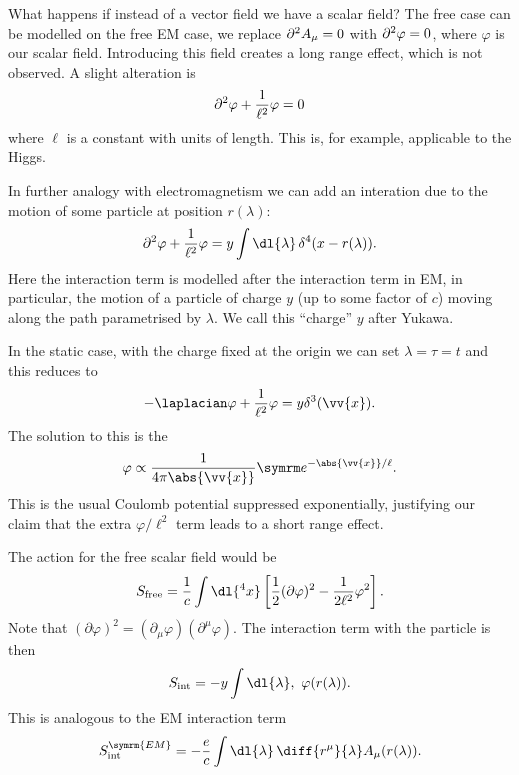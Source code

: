 What happens if instead of a vector field we have a scalar field?
The free case can be modelled on the free EM case, we replace \(\partial^2 A_\mu = 0\) with \(\partial^2 \varphi = 0\), where \(\varphi\) is our scalar field.
Introducing this field creates a long range effect, which is not observed.
A slight alteration is
\begin{equation}
    \partial^2 \varphi + \frac{1}{\ell^2} \varphi = 0
\end{equation}
where \(\ell\) is a constant with units of length.
This is, for example, applicable to the Higgs.

In further analogy with electromagnetism we can add an interation due to the motion of some particle at position \(r(\lambda)\):
\begin{equation}
    \dalembertian \varphi + \frac{1}{\ell^2}\varphi = y\int \dl{\lambda} \, \delta^4(x - r(\lambda)).
\end{equation}
Here the interaction term is modelled after the interaction term in EM, in particular, the motion of a particle of charge \(y\) (up to some factor of \(c\)) moving along the path parametrised by \(\lambda\).
We call this \enquote{charge} \(y\) after Yukawa.

In the static case, with the charge fixed at the origin we can set \(\lambda = \tau = t\) and this reduces to
\begin{equation}
    -\laplacian\varphi + \frac{1}{\ell^2}\varphi = y\delta^3(\vv{x}).
\end{equation}
The solution to this is the 
\begin{equation}
    \varphi \propto \frac{1}{4\pi \abs{\vv{x}}} \e^{-\abs{\vv{x}}/\ell}.
\end{equation}
This is the usual Coulomb potential suppressed exponentially, justifying our claim that the extra \(\varphi/\ell^2\) term leads to a short range effect.

The action for the free scalar field would be
\begin{equation}
    S_{\text{free}} = \frac{1}{c} \int \dl{^4x} \left[ \frac{1}{2}(\partial \varphi)^2 - \frac{1}{2\ell^2}\varphi^2 \right].
\end{equation}
Note that \((\partial\varphi)^2 = (\partial_\mu \varphi)(\partial^\mu \varphi)\).
The interaction term with the particle is then
\begin{equation}
    S_{\text{int}} = -y\int \dl{\lambda} ,\ \varphi(r(\lambda)).
\end{equation}
This is analogous to the EM interaction term
\begin{equation}
    S_{\text{int}}^{\symrm{EM}} = -\frac{e}{c} \int \dl{\lambda} \, \diff{r^\mu}{\lambda} A_\mu (r(\lambda)).
\end{equation}

